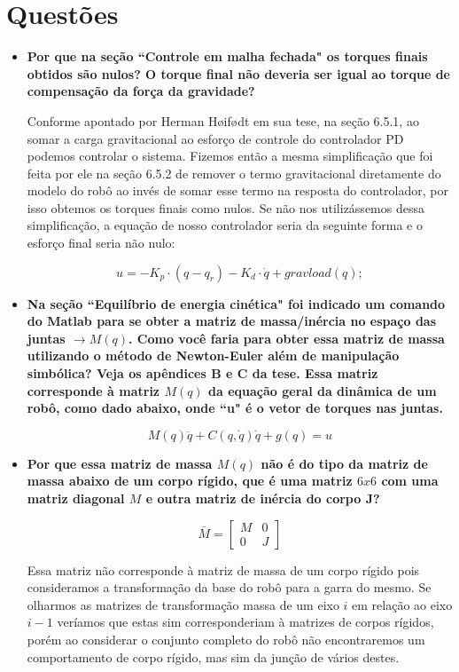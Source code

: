\documentclass{article}
\begin{document}
\section{Questões}
\begin{itemize}
	\item \textbf{Por que na seção ``Controle em malha fechada" os torques finais obtidos são nulos? O torque final não deveria ser igual ao torque de compensação da força da gravidade?}
	
	Conforme apontado por Herman Høifødt\cite{bb:tese} em sua tese, na seção 6.5.1, ao somar a carga gravitacional ao esforço de controle do controlador PD podemos controlar o sistema. Fizemos então a mesma simplificação que foi feita por ele na seção 6.5.2 de remover o termo gravitacional diretamente do modelo do robô ao invés de somar esse termo na resposta do controlador, por isso obtemos os torques finais como nulos.
	Se não nos utilizássemos dessa simplificação, a equação de nosso controlador seria da seguinte forma e o esforço final seria não nulo:
	
	\begin{equation}
		u = -K_p\cdot (q - q_r) -K_d\cdot\dot{q} + gravload(q);
	\end{equation}
	
	\item \textbf{Na seção ``Equilíbrio de energia cinética" foi indicado um comando do Matlab para se obter a matriz de massa/inércia no espaço das juntas $\rightarrow M(q)$. Como você faria para obter essa matriz de massa utilizando o método de Newton-Euler além de manipulação simbólica? Veja os apêndices B e C da tese\cite{bb:tese}. Essa matriz corresponde à matriz $M(q)$ da equação geral da dinâmica de um robô, como dado abaixo, onde ``u" é o vetor de torques nas juntas.}
	
	\begin{equation}
	\label{eq:mq}
	M(q)\ddot{q}+C(q,\dot{q})\dot{q}+g(q)=u
	\end{equation}
	
	
	\item \textbf{Por que essa matriz de massa $M(q)$ não é do tipo da matriz de massa abaixo de um corpo rígido, que é uma matriz $6x6$ com uma matriz diagonal $M$ e outra matriz de inércia do corpo J?}
	
	\begin{equation}
	\label{eq:m6x6}
	\bar{M}=\begin{bmatrix}
	M & 0\\
	0 & J
	\end{bmatrix}
	\end{equation}
	
	Essa matriz não corresponde à matriz de massa de um corpo rígido pois consideramos a transformação da base do robô para a garra do mesmo. Se olharmos as matrizes de transformação massa de um eixo $i$ em relação ao eixo $i-1$ veríamos que estas sim corresponderiam à matrizes de corpos rígidos, porém ao considerar o conjunto completo do robô não encontraremos um comportamento de corpo rígido, mas sim da junção de vários destes.
	
\end{itemize}
\end{document}
